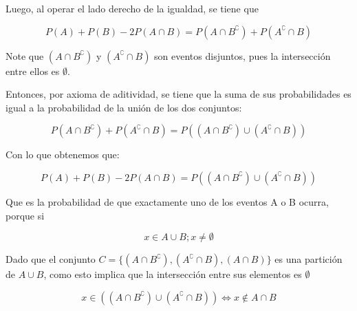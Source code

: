 \documentclass{homeworg}
\begin{document}
Luego, al operar el lado derecho de la igualdad, se tiene que

\[P(A) + P(B) - 2P(A \cap B) = P(A \cap B^\complement) + P(A^\complement \cap B)\]

Note que $(A \cap B^\complement)$ y $(A^\complement \cap B)$ son eventos disjuntos, pues la intersección entre ellos es $\emptyset$.

Entonces, por axioma de aditividad, se tiene que la suma de sus probabilidades es igual a la probabilidad de la unión de los dos conjuntos:

\[P(A \cap B^\complement) + P(A^\complement \cap B) = P((A \cap B^\complement) \cup (A^\complement \cap B))\]

Con lo que obtenemos que:

\[P(A) + P(B) - 2P(A \cap B) = P((A \cap B^\complement) \cup (A^\complement \cap B))\]

Que es la probabilidad de que exactamente uno de los eventos A o B ocurra, porque si 

\[x \in A \cup B ; x \neq \emptyset \]

Dado que el conjunto $C = \{(A \cap B^\complement), (A^\complement \cap B), (A \cap B)\}$ es una partición de $A \cup B$, como esto implica que la intersección entre sus elementos es $\emptyset$

\[x \in ( (A \cap B^\complement) \cup (A^\complement \cap B) ) \iff x \notin A \cap B \]




\setlength\parindent{400pt}\scalebox{0.8}{$\square$}
\end{document}
